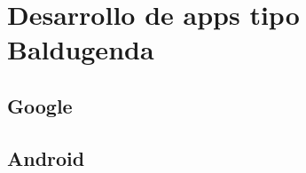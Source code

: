 \chapter{Desarrollo de apps tipo Baldugenda}
\label{ch:desarrollo}



\section{Google}
\label{secc:google}

\section{Android}
\label{secc:android}























